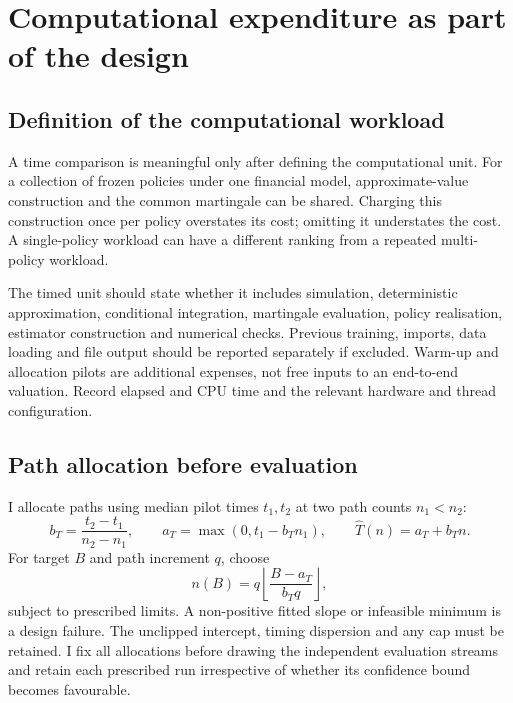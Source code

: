 \section{Computational expenditure as part of the design}

\subsection{Definition of the computational workload}

A time comparison is meaningful only after defining the computational unit. For a collection of frozen policies under one financial model, approximate-value construction and the common martingale can be shared. Charging this construction once per policy overstates its cost; omitting it understates the cost. A single-policy workload can have a different ranking from a repeated multi-policy workload.

The timed unit should state whether it includes simulation, deterministic approximation, conditional integration, martingale evaluation, policy realisation, estimator construction and numerical checks. Previous training, imports, data loading and file output should be reported separately if excluded. Warm-up and allocation pilots are additional expenses, not free inputs to an end-to-end valuation. Record elapsed and CPU time and the relevant hardware and thread configuration.

\subsection{Path allocation before evaluation}

I allocate paths using median pilot times $t_1,t_2$ at two path counts $n_1<n_2$:
\begin{equation}
 b_T=\frac{t_2-t_1}{n_2-n_1},\qquad
 a_T=\max(0,t_1-b_Tn_1),\qquad
 \widehat T(n)=a_T+b_Tn.
\label{eq:timing}
\end{equation}
For target $B$ and path increment $q$, choose
\begin{equation}
 n(B)=q\left\lfloor\frac{B-a_T}{b_Tq}\right\rfloor,
\label{eq:allocation}
\end{equation}
subject to prescribed limits. A non-positive fitted slope or infeasible minimum is a design failure. The unclipped intercept, timing dispersion and any cap must be retained. I fix all allocations before drawing the independent evaluation streams and retain each prescribed run irrespective of whether its confidence bound becomes favourable.

